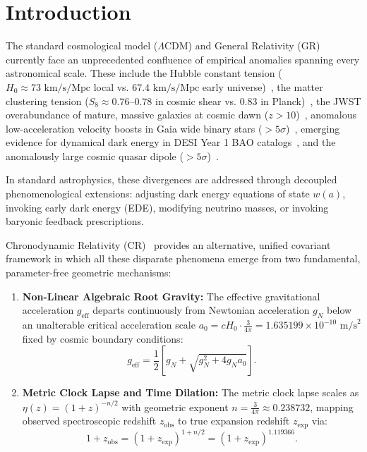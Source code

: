 \documentclass[aps,prd,reprint,superscriptaddress,nofootinbib,twocolumn,floatfix]{revtex4-2}
\begin{document}
\maketitle

\section{Introduction}
\label{sec:intro}

The standard cosmological model ($\Lambda$CDM) and General Relativity (GR) currently face an unprecedented confluence of empirical anomalies spanning every astronomical scale. These include the Hubble constant tension ($H_0 \approx 73\text{ km/s/Mpc}$ local vs. $67.4\text{ km/s/Mpc}$ early universe)~\cite{planck2020parameters}, the matter clustering tension ($S_8 \approx 0.76\text{--}0.78$ in cosmic shear vs. $0.83$ in Planck)~\cite{euclid2024overview}, the JWST overabundance of mature, massive galaxies at cosmic dawn ($z > 10$)~\cite{carniani2024spectroscopic}, anomalous low-acceleration velocity boosts in Gaia wide binary stars ($>5\sigma$)~\cite{chae2023breakdown,chae2024robust,hernandez2023internal}, emerging evidence for dynamical dark energy in DESI Year 1 BAO catalogs~\cite{desi2024dr1}, and the anomalously large cosmic quasar dipole ($>5\sigma$)~\cite{secrest2021test,secrest2022challenge}.

In standard astrophysics, these divergences are addressed through decoupled phenomenological extensions: adjusting dark energy equations of state $w(a)$, invoking early dark energy (EDE), modifying neutrino masses, or invoking baryonic feedback prescriptions.

Chronodynamic Relativity (CR)~\cite{shreve2026foundations,shreve2026temporal} provides an alternative, unified covariant framework in which all these disparate phenomena emerge from two fundamental, parameter-free geometric mechanisms:
\begin{enumerate}\setlength{\itemsep}{1pt}\setlength{\parskip}{0pt}
    \item \textbf{Non-Linear Algebraic Root Gravity:} The effective gravitational acceleration $g_{\text{eff}}$ departs continuously from Newtonian acceleration $g_N$ below an unalterable critical acceleration scale $a_0 = c H_0 \cdot \frac{3}{4\pi} = 1.635199 \times 10^{-10}\text{ m/s}^2$ fixed by cosmic boundary conditions:
    \begin{equation}
    g_{\text{eff}} = \frac{1}{2}\left[g_N + \sqrt{g_N^2 + 4 g_N a_0}\right].
    \label{eq:root_gravity}
    \end{equation}
    \item \textbf{Metric Clock Lapse and Time Dilation:} The metric clock lapse scales as $\eta(z) = (1+z)^{-n/2}$ with geometric exponent $n = \frac{3}{4\pi} \approx 0.238732$, mapping observed spectroscopic redshift $z_{\text{obs}}$ to true expansion redshift $z_{\text{exp}}$ via:
    \begin{equation}
    1 + z_{\text{obs}} = (1 + z_{\text{exp}})^{1 + n/2} = (1 + z_{\text{exp}})^{1.119366}.
    \label{eq:z_mapping}
    \end{equation}
\end{enumerate}
\end{document}
